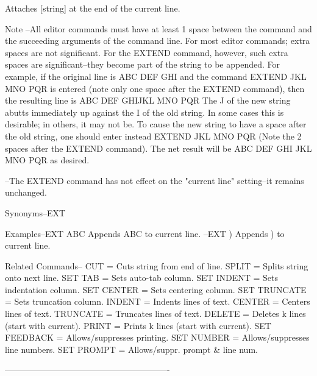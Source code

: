           Attaches [string] at the end
          of the current line.
 
Note    --All editor commands must have at least 1 space
          between the command and the succeeding
          arguments of the command line.  For
          most editor commands; extra spaces
          are not significant.  For the EXTEND
          command, however, such extra spaces are
          significant--they become part of the string
          to be appended.  For example, if the
          original line is
             ABC DEF GHI
          and the command
             EXTEND JKL MNO PQR
          is entered (note only one space
          after the EXTEND command), then
          the resulting line is
             ABC DEF GHIJKL MNO PQR
          The    J   of the new string abutts
          immediately up against the    I
          of the old string.  In some cases
          this is desirable; in others, it may
          not be.  To cause the new string to
          have a space after the old string,
          one should enter instead
             EXTEND  JKL MNO PQR
          (Note the 2 spaces after the EXTEND
          command).  The net result will be
             ABC DEF GHI JKL MNO PQR
          as desired.
 
        --The EXTEND command has not effect
          on the "current line" setting--it
          remains unchanged.
 
Synonyms--EXT
 
Examples--EXT ABC          Appends ABC to current line.
        --EXT )            Appends ) to current line.
 
Related Commands--
          CUT             = Cuts string from end of line.
          SPLIT           = Splits string onto next line.
          SET TAB         = Sets auto-tab column.
          SET INDENT      = Sets indentation column.
          SET CENTER      = Sets centering column.
          SET TRUNCATE    = Sets truncation column.
          INDENT          = Indents lines of text.
          CENTER          = Centers lines of text.
          TRUNCATE        = Truncates lines of text.
          DELETE          = Deletes k lines (start with current).
          PRINT           = Prints k lines (start with current).
          SET FEEDBACK    = Allows/suppresses printing.
          SET NUMBER      = Allows/suppresses line numbers.
          SET PROMPT      = Allows/suppr. prompt & line num.
 
----------------------------------------------------------
 
